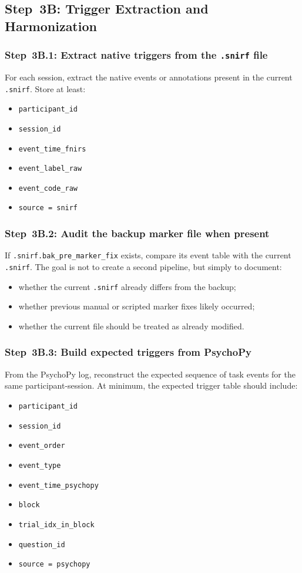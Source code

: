 \documentclass[11pt]{article}
\begin{document}
\subsection{Step~3B: Trigger Extraction and Harmonization}

\subsubsection{Step~3B.1: Extract native triggers from the \texttt{.snirf} file}
For each session, extract the native events or annotations present in the current \texttt{.snirf}.
Store at least:
\begin{itemize}
    \item \texttt{participant\_id}
    \item \texttt{session\_id}
    \item \texttt{event\_time\_fnirs}
    \item \texttt{event\_label\_raw}
    \item \texttt{event\_code\_raw}
    \item \texttt{source = snirf}
\end{itemize}

\subsubsection{Step~3B.2: Audit the backup marker file when present}
If \texttt{.snirf.bak\_pre\_marker\_fix} exists, compare its event table with the current \texttt{.snirf}.
The goal is not to create a second pipeline, but simply to document:
\begin{itemize}
    \item whether the current \texttt{.snirf} already differs from the backup;
    \item whether previous manual or scripted marker fixes likely occurred;
    \item whether the current file should be treated as already modified.
\end{itemize}

\subsubsection{Step~3B.3: Build expected triggers from PsychoPy}
From the PsychoPy log, reconstruct the expected sequence of task events for the same participant-session.
At minimum, the expected trigger table should include:
\begin{itemize}
    \item \texttt{participant\_id}
    \item \texttt{session\_id}
    \item \texttt{event\_order}
    \item \texttt{event\_type}
    \item \texttt{event\_time\_psychopy}
    \item \texttt{block}
    \item \texttt{trial\_idx\_in\_block}
    \item \texttt{question\_id}
    \item \texttt{source = psychopy}
\end{itemize}
\end{document}
